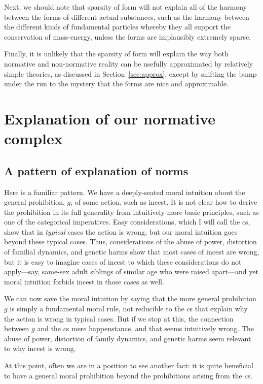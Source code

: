 Next, we should note that sparsity of form will not explain all of the harmony between the forms of different 
actual substances, such as the harmony between the different kinds of fundamental particles whereby they all support the conservation of mass-energy, unless the forms are implausibly extremely sparse.

Finally, it is unlikely that the sparsity of form will explain the way both normative and non-normative 
reality can be usefully approximated by relatively simple theories, as discussed in Section~\ref{sec:approx},
except by shifting the bump under the run to the mystery that the forms are nice and approximable.

\section{Explanation of our normative complex}
\subsection{A pattern of explanation of norms}\label{sec:moral-explanation}
Here is a familiar pattern. We have a deeply-seated moral intuition about the general prohibition, $g$, of some action,
such as incest. It is not clear how to derive the prohibition in its full generality from intuitively more basic principles, such as one of 
the categorical imperatives. Easy considerations, which I will call the $c$s, show that in \textit{typical} cases the action is wrong,
but our moral intuition goes beyond these typical cases. Thus, considerations of the abuse of power, distortion of 
familial dynamics, and genetic harms show that most cases of incest are wrong, but it is easy to imagine cases
of incest to which these considerations do not apply---say, same-sex adult siblings of similar age who were raised 
apart---and yet moral intuition forbids incest in those cases as well.

We can now save the moral intuition by saying that the more general prohibition $g$ is simply a fundamental moral rule,
not reducible to the $c$s that explain why the action is wrong in typical cases. But if we stop
at this, the connection between $g$ and the $c$s mere happenstance, and that seems intuitively wrong. The abuse of 
power, distortion of family dynamics, and genetic harms seem relevant to why incest is wrong.

At this point, often we are in a position to see another fact: it is quite beneficial to have a 
general moral prohibition beyond the prohibitions arising from the $c$s. 

